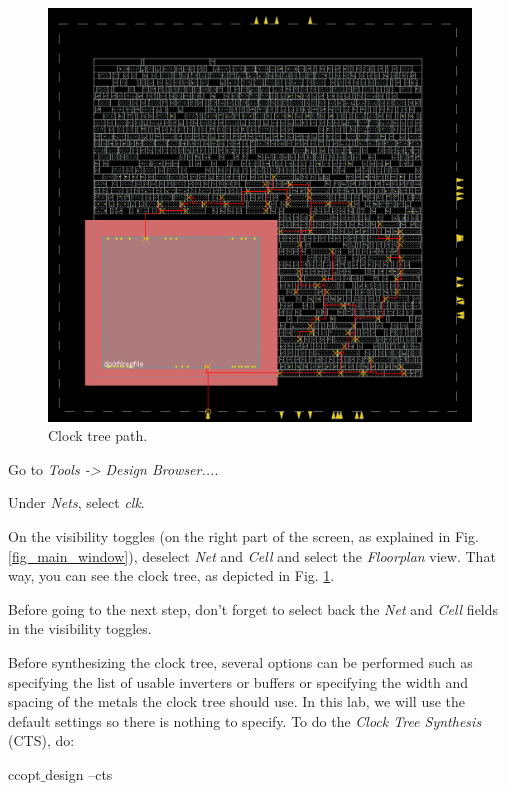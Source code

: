 \begin{enumerate}
	\parbox[t]{\dimexpr\textwidth-\leftmargin}{%
	\begin{figure}
		\vspace{0mm}
		\centering
		\vspace{-\baselineskip}
		\includegraphics[scale=0.3]{figures/lab5_backend/clock_tree_view}
		\caption{Clock tree path.}
		\label{clock_tree_view}
	\end{figure}
\item Go to \textit{Tools -> Design Browser...}.
\item Under \textit{Nets}, select \textit{clk}.
\item On the visibility toggles (on the right part of the screen, as explained in Fig. \ref{fig_main_window}), deselect \textit{Net} and \textit{Cell} and select the \textit{Floorplan} view. That way, you can see the clock tree, as depicted in Fig. \ref{clock_tree_view}.
\item Before going to the next step, don't forget to select back the \textit{Net} and \textit{Cell} fields in the visibility toggles.
\item Before synthesizing the clock tree, several options can be performed such as specifying the list of usable inverters or buffers or specifying the width and spacing of the metals the clock tree should use. In this lab, we will use the default settings so there is nothing to specify. To do the \textit{Clock Tree Synthesis} (CTS), do:
		\begin{codeline}
ccopt$\_$design –cts
\end{codeline}} 


\end{enumerate}
